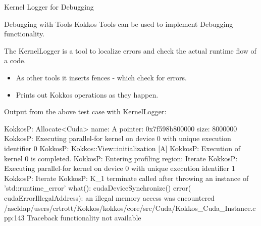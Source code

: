 \begin{frame}[fragile]{Kernel Logger for Debugging}
\begin{block}{Debugging with Tools}
Kokkos Tools can be used to implement Debugging functionality.
\end{block}

\pause
The KernelLogger is a tool to localize errors and check the actual runtime flow of a code.
\begin{itemize}
  \item As other tools it inserts fences - which check for errors.
  \item Prints out Kokkos operations as they happen.
\end{itemize}

\pause
Output from the above test case with KernelLogger:

\vspace{-5pt}
\begin{code}
KokkosP: Allocate<Cuda> name: A pointer: 0x7f598b800000 size: 8000000
KokkosP: Executing parallel-for kernel on device 0 with unique execution identifier 0
KokkosP: Kokkos::View::initialization [A]
KokkosP: Execution of kernel 0 is completed.
KokkosP: Entering profiling region: Iterate
KokkosP: Executing parallel-for kernel on device 0 with unique execution identifier 1
KokkosP: Iterate
KokkosP:   K_1
terminate called after throwing an instance of 'std::runtime_error'
  what():  cudaDeviceSynchronize() error( cudaErrorIllegalAddress): an illegal memory access was encountered /ascldap/users/crtrott/Kokkos/kokkos/core/src/Cuda/Kokkos_Cuda_Instance.cpp:143
Traceback functionality not available
\end{code}
\end{frame}


